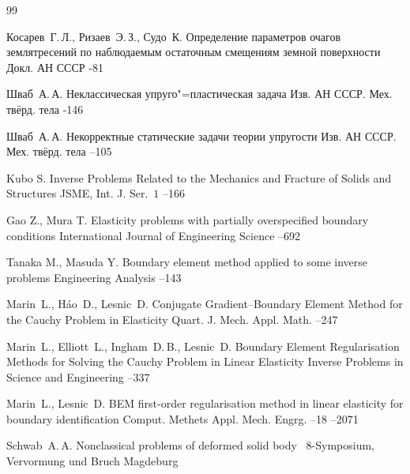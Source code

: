 \begin{thebibliography}{99}

\by Косарев~Г.\,Л., Ризаев~Э.\,З., Судо~К.
\paper Определение параметров очагов землятресений по наблюдаемым остаточным смещениям земной поверхности
\jour Докл. АН СССР
-81

\by  Шваб~А.\,А.
\paper  Неклассическая упруго"=пластическая задача 
\jour Изв. АН СССР. Мех. твёрд. тела
-146

\by  Шваб~А.\,А.
\paper Некорректные статические задачи теории упругости 
\jour Изв. АН СССР. Мех. твёрд. тела
--105

\by Kubo S.
\paper Inverse Problems Related to the Mechanics and Fracture of Solids and Structures
\jour JSME, Int. J. Ser.~$1$
--166


\by Gao Z., Mura T.
\paper Elasticity problems with partially overspecified boundary conditions
\jour International Journal of Engineering Science
--692

\Russian

\by Tanaka M., Masuda Y.
\paper Boundary element method applied to some inverse problems
\jour Engineering Analysis
--143

\Russian

\by Marin~L., H\'ao~D., Lesnic~D.
\paper Conjugate Gradient–Boundary Element Method for the Cauchy Problem in Elasticity
\jour Quart. J. Mech. Appl. Math.
--247

\by   Marin~L., Elliott~L., Ingham~D.\,B., Lesnic~D.
\paper Boundary Element Regularisation Methods for Solving the Cauchy Problem in Linear Elasticity 
\jour Inverse Problems in Science and Engineering
--337


\Russian


\by Marin~L., Lesnic~D.
\paper BEM first-order regularisation method in linear elasticity for boundary identification
\jour Comput. Methets  Appl. Mech. Engrg.
--18 
--2071

\Russian



\by  Schwab~A.\,A.
\paper Nonclassical problems of deformed solid body 
\inbook ~8-Symposium, Vervormung und Bruch
\publaddr Magdeburg


\end{thebibliography}
